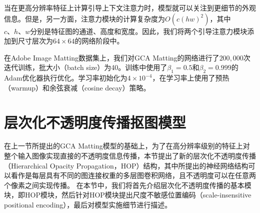 当在更高分辨率特征上计算引导上下文注意力时，模型就可以关注到更细节的外观信息。但是，另一方面，注意力模块的计算复杂度为$ O(c(hw)^2)$，其中$ c、h、w $分别是特征图的通道、高度和宽度。因此，我们将两个引导注意力模块添加到尺寸层次为$ 64 \times 64 $的网络阶段中。

在Adobe Image Matting数据集\cite{xu2017deep}上，我们对GCA Matting的网络进行了$ 200,000 $次迭代训练，批大小（batch size）为40。训练中使用了$ \beta_1 = 0.5 $和$ \beta_2 = 0.999 $的Adam优化器\cite{kingma2014adam}执行优化。学习率初始化为$ 4 \times 10^{-4} $，在学习率上使用了预热（warmup）和余弦衰减（cosine decay）\cite{loshchilov2016sgdr,goyal2017accurate,he2019bag}策略。

\section{层次化不透明度传播抠图模型}
在上一节所提出的GCA Matting模型的基础上，为了在高分辨率级别的特征上对整个输入图像实现直接的不透明度信息传播，本节提出了新的层次化不透明度传播（Hierarchical Opacity Propagation，HOP）结构，其中所提出的神经网络结构可以看作是每层具有不同的图连接权重的多层图卷积网络\cite{kipf2016semi}，且不透明度可以在任意两个像素之间实现传播。
在本节中，我们将首先介绍层次化不透明度传播的基本模块，即HOP模块，然后针对HOP模块提出尺度不敏感位置编码（scale-insensitive positional encoding），最后对模型实施细节进行描述。

\begin{figure}[t]
	\centering	 
	\centering	 
	\label{fig5:diag}
\end{figure}

